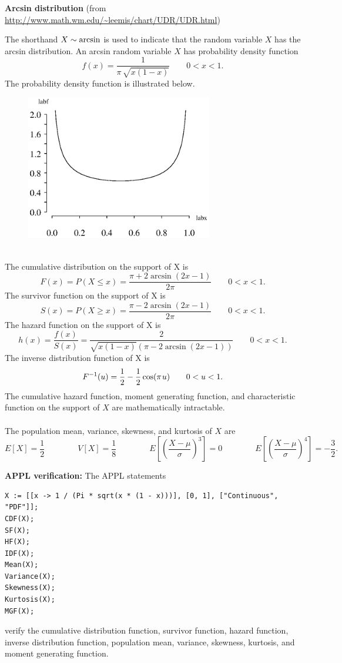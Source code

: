 \documentclass[12pt,fullpage]{article}
\begin{document}
\noindent
{\bf Arcsin distribution} (from \color{blue}\url{http://www.math.wm.edu/~leemis/chart/UDR/UDR.html}\color{black})

\noindent
The shorthand $X \sim {\rm arcsin}$ is used to indicate that the
random variable $X$ has the arcsin distribution.
An arcsin random variable $X$ has probability density function 
$$
f(x) = {\frac {1}{\pi \,\sqrt {x \left( 1-x \right) }}}
 \quad \quad 0<x<1.
$$
The probability density function is illustrated below.
{\begin{figure}[h!]
\begin{center}
\includegraphics[width=3.2in]{ArcsinPlot.ps}
\end{center}
\end{figure}}\\
The cumulative distribution on the support of X is
$$
F(x) = P(X \leq x) = \frac{\pi + 2\arcsin(2x-1)}{2\pi} \quad \quad 0<x<1.
$$
The survivor function on the support of X is
$$
S(x) = P(X \geq x) = \frac{\pi - 2\arcsin(2x-1)}{2\pi} \quad \quad 0<x<1.
$$
The hazard function on the support of X is
$$
h(x)=\frac{f(x)}{S(x)}= \frac{2}{\sqrt{x(1-x)}(\pi - 2\arcsin(2x-1))}\quad \quad 0<x<1.
$$
The inverse distribution function of X is
$$
F^{-1}(u)= \frac{1}{2} -\frac{1}{2}\cos(\pi \kern 0.08 em u) \quad \quad 0 < u < 1.
$$
The cumulative hazard function, moment generating function, and characteristic function
on the support of $X$ are mathematically intractable.\\
\\
\noindent
The population mean, variance, skewness, and kurtosis of $X$ are
$$
E[X] =\frac{1}{2} \qquad \qquad 
V[X] = \frac{1}{8} \qquad \qquad 
E\left[ \left( \frac{X - \mu}{\sigma} \right) ^ 3 \right] = 0 \qquad \qquad 
E\left[ \left( \frac{X - \mu}{\sigma} \right) ^ 4 \right] = -\frac{3}{2}.
$$

\vspace{0.1in}

\noindent
{\bf APPL verification:}
The APPL statements
\begin{verbatim}
X := [[x -> 1 / (Pi * sqrt(x * (1 - x)))], [0, 1], ["Continuous", "PDF"]];
CDF(X);
SF(X);
HF(X);
IDF(X);
Mean(X);
Variance(X);
Skewness(X);
Kurtosis(X);
MGF(X);
\end{verbatim}
verify the cumulative distribution function, survivor function, hazard function, inverse distribution function, population mean, variance, skewness, kurtosis, and moment generating function.
\end{document}

